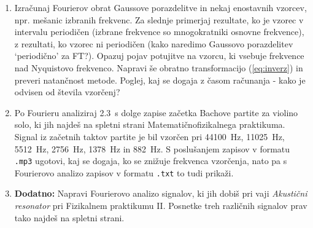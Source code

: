 \documentclass[slovene,11pt,a4paper]{article}
\begin{document}
\begin{enumerate}
\item Izračunaj Fourierov obrat Gaussove porazdelitve in nekaj enostavnih vzorcev,
npr. mešanic izbranih frekvenc. Za slednje primerjaj rezultate, ko
je vzorec v intervalu periodičen (izbrane frekvence so mnogokratniki
osnovne frekvence), z rezultati, ko vzorec ni periodičen (kako naredimo Gaussovo porazdelitev `periodično' za FT?).
Opazuj pojav potujitve na vzorcu, ki vsebuje frekvence nad Nyquistovo
frekvenco. Napravi še obratno transformacijo (\ref{eq:inverz}) in preveri
natančnost metode. Poglej, kaj se dogaja z časom računanja - kako je odvisen od števila vzorčenj?
\item Po Fourieru analiziraj \SI{2.3}{s} dolge zapise začetka Bachove
partite za violino solo, ki jih najdeš na spletni strani
Matematičnofizikalnega praktikuma.  Signal iz začetnih taktov
partite je bil vzorčen pri \SI{44100}{Hz}, \SI{11025}{Hz}, \SI{5512}{Hz}, \SI{2756}{Hz},
\SI{1378}{Hz} in \SI{882}{Hz}.  S poslušanjem zapisov v formatu {\tt .mp3}
ugotovi, kaj se dogaja, ko se znižuje frekvenca vzorčenja,
nato pa s Fourierovo analizo zapisov v formatu {\tt .txt}
to tudi prikaži.
\item \textbf{Dodatno:} Napravi Fourierovo analizo signalov, ki jih dobiš pri vaji
{\sl Akustični resonator\/} pri Fizikalnem praktikumu II.
Posnetke treh različnih signalov prav tako najdeš na spletni strani.
\end{enumerate}



\end{document}
